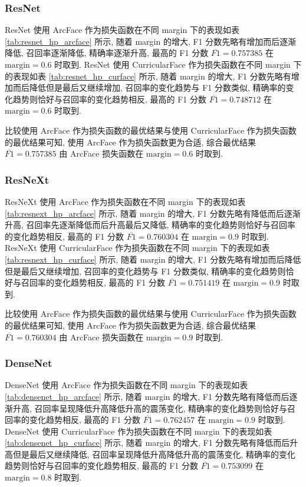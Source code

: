 \documentclass[12pt]{article}
\begin{document}
\subsubsection{ResNet}

ResNet 使用 ArcFace 作为损失函数在不同 margin 下的表现如表 \ref{tab:resnet_hp_arcface} 所示, 随着 margin 的增大, F1 分数先略有增加而后逐渐降低, 召回率逐渐降低, 精确率逐渐升高, 最高的 F1 分数 $\overline{F1}=0.757385$ 在 $\text{margin} = 0.6$ 时取到. ResNet 使用 CurricularFace 作为损失函数在不同 margin 下的表现如表 \ref{tab:resnet_hp_curface} 所示, 随着 margin 的增大, F1 分数先略有增加而后降低但是最后又继续增加, 召回率的变化趋势与 F1 分数类似, 精确率的变化趋势则恰好与召回率的变化趋势相反, 最高的 F1 分数 $\overline{F1}=0.748712$ 在 $\text{margin} = 0.6$ 时取到.

比较使用 ArcFace 作为损失函数的最优结果与使用 CurricularFace 作为损失函数的最优结果可知, 使用 ArcFace 作为损失函数更为合适, 综合最优结果 $\overline{F1}=0.757385$ 由 ArcFace 损失函数在 $\text{margin} = 0.6$ 时取到.

\subsubsection{ResNeXt}

ResNeXt 使用 ArcFace 作为损失函数在不同 margin 下的表现如表 \ref{tab:resnext_hp_arcface} 所示, 随着 margin 的增大, F1 分数先略有降低而后逐渐升高, 召回率先逐渐降低而后升高最后又降低, 精确率的变化趋势则恰好与召回率的变化趋势相反, 最高的 F1 分数 $\overline{F1}=0.760304$ 在 $\text{margin} = 0.9$ 时取到. ResNeXt 使用 CurricularFace 作为损失函数在不同 margin 下的表现如表 \ref{tab:resnext_hp_curface} 所示, 随着 margin 的增大, F1 分数先略有增加而后降低但是最后又继续增加, 召回率的变化趋势与 F1 分数类似, 精确率的变化趋势则恰好与召回率的变化趋势相反, 最高的 F1 分数 $\overline{F1}=0.751419$ 在 $\text{margin} = 0.9$ 时取到.

比较使用 ArcFace 作为损失函数的最优结果与使用 CurricularFace 作为损失函数的最优结果可知, 使用 ArcFace 作为损失函数更为合适, 综合最优结果 $\overline{F1}=0.760304$ 由 ArcFace 损失函数在 $\text{margin} = 0.9$ 时取到.

\subsubsection{DenseNet}

DenseNet 使用 ArcFace 作为损失函数在不同 margin 下的表现如表 \ref{tab:densenet_hp_arcface} 所示, 随着 margin 的增大, F1 分数先略有降低而后逐渐升高, 召回率呈现降低升高降低升高的震荡变化, 精确率的变化趋势则恰好与召回率的变化趋势相反, 最高的 F1 分数 $\overline{F1}=0.762457$ 在 $\text{margin} = 0.9$ 时取到. DenseNet 使用 CurricularFace 作为损失函数在不同 margin 下的表现如表 \ref{tab:densenet_hp_curface} 所示, 随着 margin 的增大, F1 分数先略有降低而后升高但是最后又继续降低, 召回率呈现降低升高降低升高的震荡变化, 精确率的变化趋势则恰好与召回率的变化趋势相反, 最高的 F1 分数 $\overline{F1}=0.753099$ 在 $\text{margin} = 0.8$ 时取到.
\end{document}
